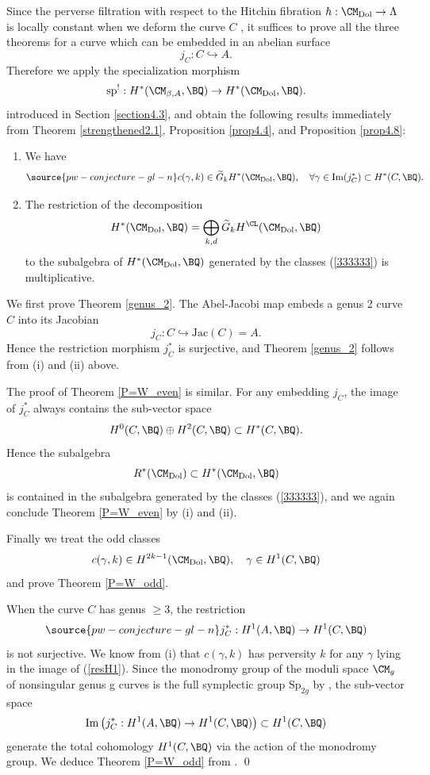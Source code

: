 Since the perverse filtration with respect to the Hitchin fibration $h: \CM_{\mathrm{Dol}} \to \Lambda$ is locally constant when we deform the curve $C$ \cite{dCM}, it suffices to prove all the three theorems for a curve which can be embedded in an abelian surface
\[
j_C: C\hookrightarrow A.
\]
Therefore we apply the specialization morphism
\[
\mathrm{sp}^!: H^*(\CM_{\beta, A}, \BQ) \to H^*(\CM_{\mathrm{Dol}}, \BQ).
\]
introduced in Section \ref{section4.3}, and obtain the following results immediately from Theorem \ref{strengthened2.1}, Proposition \ref{prop4.4}, and Proposition \ref{prop4.8}:
\begin{enumerate}
    \item[(i)] We have
    \begin{equation}\label{333333}
\source{pw-conjecture-gl-n}
    c(\gamma, k) \in \widetilde{G}_kH^*(\CM_{\mathrm{Dol}}, \BQ), \quad \forall \gamma \in \mathrm{Im}({j_C^*}) \subset H^*(C, \BQ).
    \end{equation}
    \item[(ii)] The restriction of the decomposition \[
    H^*(\CM_{\mathrm{Dol}}, \BQ)= \bigoplus_{k,d}\widetilde{G}_kH^\CL(\CM_{\mathrm{Dol}}, \BQ)
    \]to the subalgebra of $H^*(\CM_{\mathrm{Dol}}, \BQ)$ generated by the classes (\ref{333333}) is multiplicative.
\end{enumerate}

We first prove Theorem \ref{genus_2}. The Abel-Jacobi map embeds a genus 2 curve $C$ into its Jacobian
\[
j_C: C \hookrightarrow \mathrm{Jac}(C) = A.
\]
Hence the restriction morphism $j_C^*$ is surjective, and Theorem \ref{genus_2} follows from (i) and (ii) above.

The proof of Theorem \ref{P=W_even} is similar. For any embedding $j_C$, the image of $j_C^*$ always contains the sub-vector space
\[
H^0(C, \BQ) \oplus H^2(C, \BQ) \subset H^*(C, \BQ).
\]
Hence the subalgebra
\[
R^*(\CM_{\mathrm{Dol}}) \subset H^*(\CM_{\mathrm{Dol}}, \BQ)
\]
is contained in the subalgebra generated by the classes (\ref{333333}), and we again conclude Theorem \ref{P=W_even} by (i) and (ii).

Finally we treat the odd classes
\[
c(\gamma, k) \in H^{2k-1}(\CM_{\mathrm{Dol}}, \BQ), \quad \gamma\in H^1(C, \BQ)
\]
and prove Theorem \ref{P=W_odd}.

When the curve $C$ has genus $\geq 3$, the restriction
\begin{equation}\label{resH1}
\source{pw-conjecture-gl-n}
j_C^*: H^1(A, \BQ) \to H^1(C, \BQ)
\end{equation}
is not surjective. We know from (i) that $c(\gamma, k)$ has perversity $k$ for any $\gamma$ lying in the image of (\ref{resH1}). Since the monodromy group of the moduli space $\CM_g$ of nonsingular genus g curves is the full symplectic group $\mathrm{Sp}_{2g}$ by \cite{A}, the sub-vector space
\[
\mathrm{Im}\left({j_C^*}:H^1(A, \BQ)\to H^1(C,\BQ) \right) \subset H^1(C, \BQ)
\]
generate the total cohomology $H^1(C, \BQ)$ via the action of the monodromy group. We deduce Theorem \ref{P=W_odd} from \cite{dCM}. \qed
